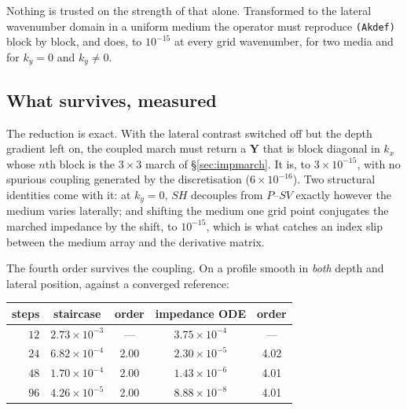 \documentclass[11pt,a4paper]{article}
\newcommand{\bY}{\mathbf{Y}}
\begin{document}
Nothing is trusted on the strength of that alone.  Transformed to the lateral
wavenumber domain in a uniform medium the operator must reproduce
\texttt{(Akdef)} block by block, and does, to $10^{-15}$ at every grid
wavenumber, for two media and for $k_y = 0$ and $k_y\neq0$.

\subsection{What survives, measured}

The reduction is exact.  With the lateral contrast switched off but the depth
gradient left on, the coupled march must return a $\bY$ that is block diagonal
in $k_x$ whose $n$th block is the $3\times3$ march of \S\ref{sec:impmarch}.  It
is, to $3\times10^{-15}$, with no spurious coupling generated by the
discretisation ($6\times10^{-16}$).  Two structural identities come with it: at
$k_y=0$, $SH$ decouples from $P$--$SV$ exactly however the medium varies
laterally; and shifting the medium one grid point conjugates the marched
impedance by the shift, to $10^{-15}$, which is what catches an index slip
between the medium array and the derivative matrix.

The fourth order survives the coupling.  On a profile smooth in \emph{both}
depth and lateral position, against a converged reference:

\begin{center}
\begin{tabular}{@{}rcccc@{}}
\toprule
steps & staircase & order & impedance ODE & order\\
\midrule
 $12$ & $2.73\times10^{-3}$ & ---  & $3.75\times10^{-4}$ & ---\\
 $24$ & $6.82\times10^{-4}$ & 2.00 & $2.30\times10^{-5}$ & 4.02\\
 $48$ & $1.70\times10^{-4}$ & 2.00 & $1.43\times10^{-6}$ & 4.01\\
 $96$ & $4.26\times10^{-5}$ & 2.00 & $8.88\times10^{-8}$ & 4.01\\
\bottomrule
\end{tabular}
\end{center}
\end{document}
